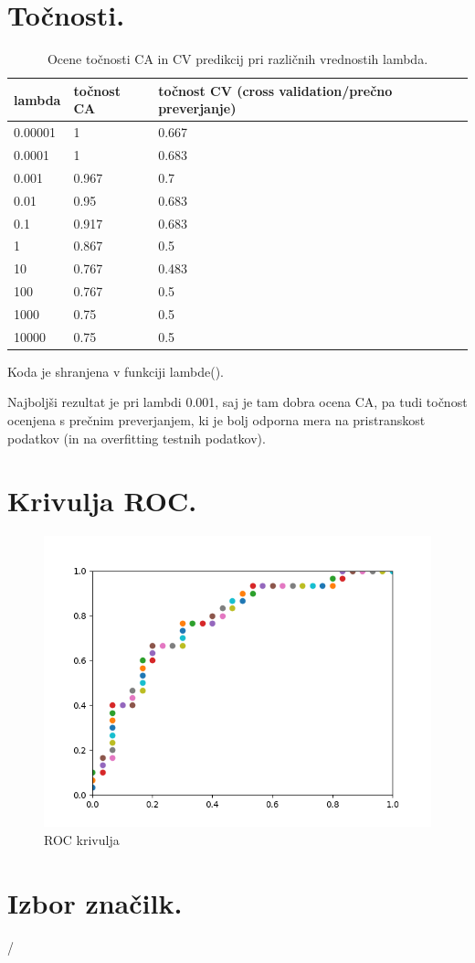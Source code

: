 \documentclass[a4paper,11pt]{article}
\begin{document}
\section{Točnosti.}
\begin{table}[htbp]
\caption{Ocene točnosti CA in CV predikcij pri različnih vrednostih lambda.}
\label{tab1}
\begin{center}
\begin{tabular}{llp{3cm}}
\hline
lambda & točnost CA & točnost CV (cross validation/prečno preverjanje) \\
\hline
0.00001 & 1 & 0.667\\
0.0001 & 1 & 0.683\\
0.001 & 0.967 &  0.7\\
0.01 & 0.95 & 0.683\\
0.1 & 0.917 & 0.683\\
1 & 0.867 & 0.5\\
10 & 0.767 & 0.483\\
100 & 0.767 & 0.5\\
1000 & 0.75 & 0.5\\
10000 & 0.75 & 0.5\\
\hline
\end{tabular}
\end{center}
\end{table}

Koda je shranjena v funkciji lambde().

Najboljši rezultat je pri lambdi 0.001, saj je tam dobra ocena CA, pa tudi točnost ocenjena s prečnim preverjanjem, ki je bolj odporna mera na  pristranskost podatkov (in na overfitting testnih podatkov).

\newpage

\section{Krivulja ROC.}

\begin{figure}[H]
\begin{center}
\includegraphics[scale=0.3]{ROC.png}
\caption{ROC krivulja}
\label{slika4}
\end{center}
\end{figure}

\section{Izbor značilk.}
/
\end{document}
